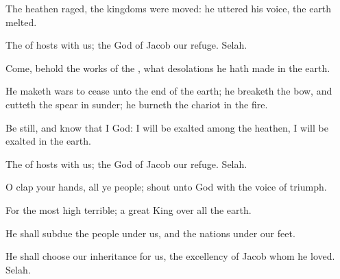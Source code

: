 {\Q {}The
heathen
raged, the
kingdoms were
moved: he
uttered his
voice, the
earth
melted.


\par }{\Q {}The
{} of
hosts
{} with us; the
God of
Jacob
{} our
refuge.
Selah.


\par }{\Q {}Come,
behold the
works of the
{}, what
desolations he hath
made in the
earth.


\par }{\Q {}He maketh
wars to
cease unto the
end of the
earth; he
breaketh the
bow, and
cutteth the
spear in
sunder; he
burneth the
chariot in the
fire.


\par }{\Q {}Be
still, and
know that I
{}
God: I will be
exalted among the
heathen, I will be
exalted in the
earth.


\par }{\Q {}The
{} of
hosts
{} with us; the
God of
Jacob
{} our
refuge.
Selah.




\par }
{\Q {}O
clap your
hands, all ye
people;
shout unto
God with the
voice of
triumph.


\par }{\Q {}For the
{} most
high
{}
terrible;
{} a
great
King over all the
earth.


\par }{\Q {}He shall
subdue the
people under us, and the
nations under our
feet.


\par }{\Q {}He shall
choose our
inheritance for us, the
excellency of
Jacob whom he
loved.
Selah.


\par }{\BB \par }
